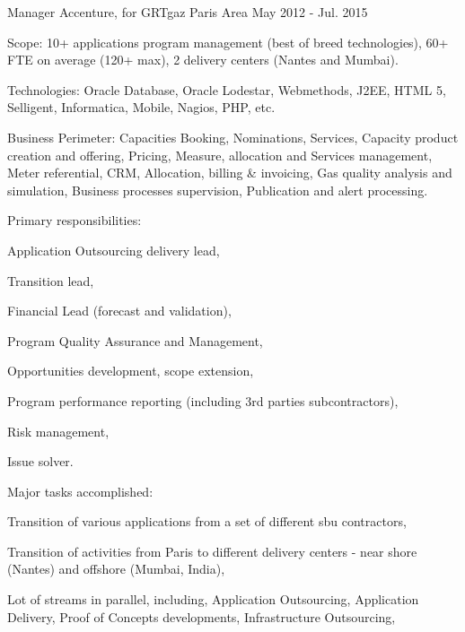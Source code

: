 \begin{cventries}
  \cventry
    {Manager} %
    {Accenture, for GRTgaz} %
    {Paris Area} %
    {May 2012 - Jul. 2015} %
    {
      \begin{cvitems} %
        \item {Scope: 10+ applications program management (best of breed technologies), 60+ FTE on average (120+ max), 2 delivery centers (Nantes and Mumbai).}
        \item {Technologies: Oracle Database, Oracle Lodestar, Webmethods, J2EE, HTML 5, Selligent, Informatica, Mobile, Nagios, PHP, etc.}
        \item {Business Perimeter: Capacities Booking, Nominations, Services, Capacity product creation and offering, Pricing, Measure, allocation and Services management, Meter referential, CRM, Allocation, billing \& invoicing, Gas quality analysis and simulation, Business processes supervision, Publication and alert processing.}
        \item {Primary responsibilities:}
        \begin{cvsubitems}
          \item {Application Outsourcing delivery lead,}
          \item {Transition lead,}
          \item {Financial Lead (forecast and validation),}
          \item {Program Quality Assurance and Management,}
          \item {Opportunities development, scope extension,}
          \item {Program performance reporting (including 3rd parties subcontractors),}
          \item {Risk management,}
          \item {Issue solver.}
        \end{cvsubitems}
        \item {Major tasks accomplished:}
        \begin{cvsubitems}
          \item {Transition of various applications from a set of different sbu contractors,}
          \item {Transition of activities from Paris to different delivery centers - near shore (Nantes) and offshore (Mumbai, India),}
          \item {Lot of streams in parallel, including, Application Outsourcing, Application Delivery, Proof of Concepts developments, Infrastructure Outsourcing,}

\end{cvsubitems}
\end{cvitems}}
\end{cventries}
